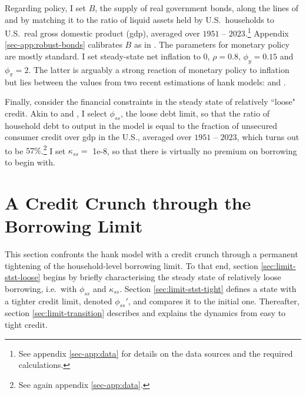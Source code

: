 \documentclass[a4paper,12pt]{article} %
\numberwithin{equation}{section} %
\numberwithin{figure}{section}
\numberwithin{table}{section}
\begin{document}
Regarding policy, I set $B$, the supply of real government bonds, along the lines of \textcite{mckay2016} and \textcite{gl2017} by matching it to the ratio of liquid assets held by U.S.~households to U.S.~real gross domestic product (\Gls{gdp}), averaged over $1951$ -- $2023$.\footnote{See appendix \ref{sec-app:data} for details on the data sources and the required calculations.} Appendix \ref{sec-app:robust-bonds} calibrates $B$ as in \textcite{bayer2023}. The parameters for monetary policy are mostly standard. I set steady-state net inflation to $0$, $\rho = 0.8$, $\phi_y = 0.15$ and $\phi_{\pi} = 2$. The latter is arguably a strong reaction of monetary policy to inflation but lies between the values from two recent estimations of \Gls{hank} models: \textcite{boehl2022} and \textcite{bayer2023}.

Finally, consider the financial constraints in the steady state of relatively ``loose" credit. Akin to \textcite{gl2017} and \textcite{bayer2023}, I select $\phi_{ss}$, the loose debt limit, so that the ratio of household debt to output in the model is equal to the fraction of unsecured consumer credit over \Gls{gdp} in the U.S., averaged over $1951$ -- $2023$, which turns out to be $57\%$.\footnote{See again appendix \ref{sec-app:data}.} I set $\kappa_{ss} =$ 1e-8, so that there is virtually no premium on borrowing to begin with.

\section{A Credit Crunch through the Borrowing Limit}
\label{sec:limit}

This section confronts the \Gls{hank} model with a credit crunch through a permanent tightening of the household-level borrowing limit. To that end, section \ref{sec:limit-stst-loose} begins by briefly characterising the steady state of relatively loose borrowing, i.e.~with $\phi_{ss}$ and $\kappa_{ss}$. Section \ref{sec:limit-stst-tight} defines a state with a tighter credit limit, denoted $\phi_{ss}'$, and compares it to the initial one. Thereafter, section \ref{sec:limit-transition} describes and explains the dynamics from easy to tight credit.

\end{document}
